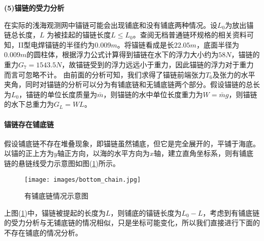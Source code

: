             \par
            \textbf{(5)锚链的受力分析}
            \par
            在实际的浅海观测网中锚链可能会出现铺底和没有铺底两种情况。设$L_0$为放出锚链总长度，$L$ 为被挂起的锚链长度$L \leqslant L_0$。查阅无档普通链环规格的相关资料可知，II型电焊锚链的半径约为$0.009m$。将锚链看成是长$22.05m$，底面半径为$0.009m$的圆柱体，根据浮力公式计算得到锚链在水下的浮力大小约为$58N$，锚链的重力$G_7 = 1543.5N$，故锚链受到的浮力远远小于重力，因此锚链的浮力对于重力而言可忽略不计。
            由前面的分析可知，我们求得了锚链前端张力$T_6$及张力的水平夹角，同时对锚链的分析可以分为有铺底链和无铺底链两个部分。假设锚链的总长为$L_0$，锚链的单位长度质量为$\bar{m}$，则锚链的水中单位长度重力为$W = \bar{m}g$，则锚链的水下总重力为$G_L = WL$。
            \paragraph{锚链存在铺底链}假设铺底链不存在堆叠现象，即锚链虽然铺底，但它是完全展开的，平铺于海底。以锚的正上方为$y$轴正方向，以海的水平方向为$x$轴，建立直角坐标系，则有铺底链的悬链线受力示意图如图(\ref{fig:有铺底链情况示意图})所示。
            \begin{figure}[H]
            \centering
            \texttt{[image: images/bottom\_chain.jpg]}
            \caption{有铺底链情况示意图}
            \label{fig:有铺底链情况示意图}
            \end{figure}
            \par
            上图(\ref{fig:有铺底链情况示意图})中，锚链被提起的长度为$L$，则铺底的锚链长度为$L_0-L$，考虑到有铺底链的受力分析与无铺底链的情况相似，只是坐标可能变化，所以我们直接进行下面的不存在铺底的情况分析。
